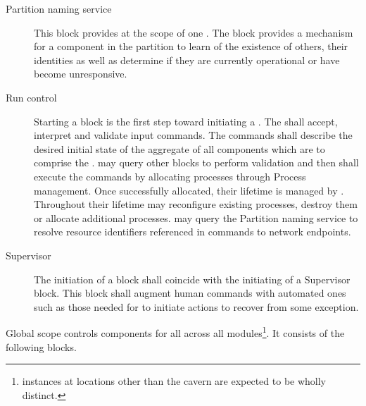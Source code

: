 \begin{description}
\item[Partition naming service] This block provides  at the scope of one . 
  The block provides a mechanism for a component in the partition to learn of the existence of others, their identities as well as determine if they are currently operational or have become unresponsive.

\item[Run control] Starting a  block is the first step toward initiating a . 
  The  shall accept, interpret and validate input commands.  The commands shall describe the desired initial state of the aggregate of all components which are to comprise the .   may query other blocks to perform validation and then shall execute the commands by allocating processes through Process management.  Once successfully allocated, their lifetime is managed by .  Throughout their lifetime  may reconfigure existing processes, destroy them or allocate additional processes.   may query the Partition naming service to resolve resource identifiers referenced in commands to network endpoints.  

\item[Supervisor] The initiation of a  block shall coincide with the initiating of a Supervisor block.  This block shall augment human commands with automated ones such as those needed for  to initiate actions to recover from some exception.

\end{description}

Global scope controls  components for all  across all  modules\footnote{ instances at locations other than the  cavern are expected to be wholly distinct.}.  It consists of the following blocks.


